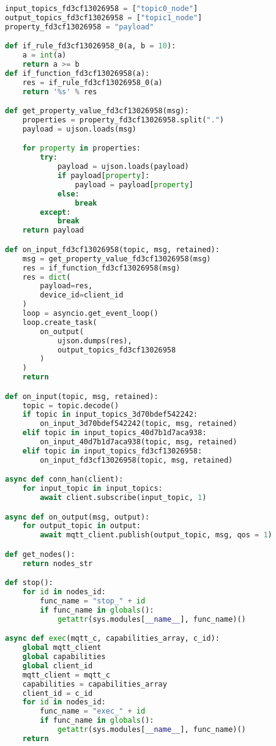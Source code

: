 \begin{lstlisting}[language=Python, caption={Code generated from the flow presented in Figure \ref{fig:code_generation_flow}.}, captionpos=b, label={lst:code_generation}]
input_topics_fd3cf13026958 = ["topic0_node"]
output_topics_fd3cf13026958 = ["topic1_node"]
property_fd3cf13026958 = "payload"

def if_rule_fd3cf13026958_0(a, b = 10):
    a = int(a)
    return a >= b
def if_function_fd3cf13026958(a):
    res = if_rule_fd3cf13026958_0(a)
    return '%s' % res

def get_property_value_fd3cf13026958(msg):
    properties = property_fd3cf13026958.split(".")
    payload = ujson.loads(msg)

    for property in properties:
        try:
            payload = ujson.loads(payload)
            if payload[property]:
                payload = payload[property]
            else:
                break
        except:
            break
    return payload

def on_input_fd3cf13026958(topic, msg, retained):
    msg = get_property_value_fd3cf13026958(msg)
    res = if_function_fd3cf13026958(msg)
    res = dict(
        payload=res,
        device_id=client_id
    )
    loop = asyncio.get_event_loop()
    loop.create_task(
        on_output(
            ujson.dumps(res),
            output_topics_fd3cf13026958
        )
    )
    return

def on_input(topic, msg, retained):
    topic = topic.decode()
    if topic in input_topics_3d70bdef542242:
        on_input_3d70bdef542242(topic, msg, retained)
    elif topic in input_topics_40d7b1d7aca938:
        on_input_40d7b1d7aca938(topic, msg, retained)
    elif topic in input_topics_fd3cf13026958:
        on_input_fd3cf13026958(topic, msg, retained)

async def conn_han(client):
    for input_topic in input_topics:
        await client.subscribe(input_topic, 1)

async def on_output(msg, output):
    for output_topic in output:
        await mqtt_client.publish(output_topic, msg, qos = 1)

def get_nodes():
    return nodes_str

def stop():
    for id in nodes_id:
        func_name = "stop_" + id
        if func_name in globals():
            getattr(sys.modules[__name__], func_name)()

async def exec(mqtt_c, capabilities_array, c_id):
    global mqtt_client
    global capabilities
    global client_id
    mqtt_client = mqtt_c
    capabilities = capabilities_array
    client_id = c_id
    for id in nodes_id:
        func_name = "exec_" + id
        if func_name in globals():
            getattr(sys.modules[__name__], func_name)()
    return
\end{lstlisting}

